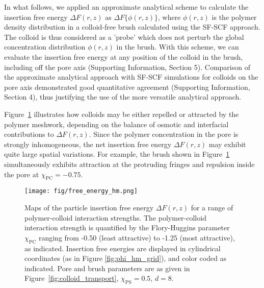 \documentclass[12pt, a4paper]{article}
\begin{document}

In what follows, we applied an approximate analytical scheme to calculate the insertion free energy $\Delta F(r,z)$ as $\Delta F\{\phi(r,z)\}$, where $\phi(r,z)$ is the polymer density distribution in a colloid-free brush calculated using the SF-SCF approach.
The colloid is thus considered as a 'probe' which does not perturb the global concentration distribution $\phi(r,z)$ in the brush.
With this scheme, we can evaluate the insertion free energy at any position of the colloid in the brush, including off the pore axis (Supporting Information, Section 5).
Comparison of the approximate analytical approach with SF-SCF simulations for colloids on the pore axis demonstrated good quantitative agreement (Supporting Information, Section 4), thus justifying the use of the more versatile analytical approach.

Figure~\ref{fig:DeltaF_map} illustrates how colloids may be either repelled or attracted by the polymer meshwork, depending on the balance of osmotic and interfacial contributions to $\Delta F(r,z)$.
Since the polymer concentration in the pore is strongly inhomogeneous, the net insertion free energy $\Delta F(r,z)$ may exhibit quite large spatial variations.
For example, the brush shown in Figure~\ref{fig:DeltaF_map} simultaneously exhibits attraction at the protruding fringes and repulsion inside the pore at $\chi_{\text{PC}}=-0.75$.

\begin{figure}
    \centering
    \texttt{[image: fig/free\_energy\_hm.png]}
    \caption{
    Maps of the particle insertion free energy $\Delta F(r,z)$ for a range of polymer-colloid interaction strengths.
    The polymer-colloid interaction strength is quantified by the Flory-Huggins parameter $\chi_{\text{PC}}$ ranging from -0.50 (least attractive) to -1.25 (most attractive), as indicated.
    Insertion free energies are displayed in cylindrical coordinates (as in Figure \ref{fig:phi_hm_grid}), and color coded as indicated.
    Pore and brush parameters are as given in Figure~\ref{fig:colloid_transport}, $\chi_{\text{PS}}=0.5$, $d=8$.
    }
    \label{fig:DeltaF_map}
\end{figure}
\end{document}
